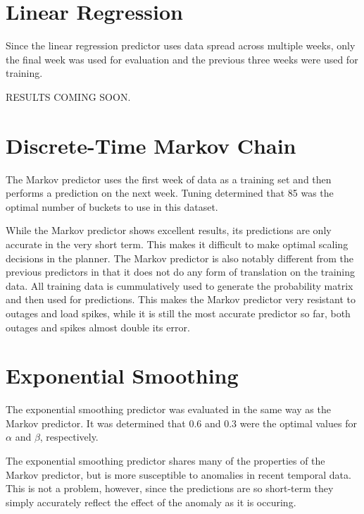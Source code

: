 

\section{Linear Regression}
Since the linear regression predictor uses data spread across multiple weeks, only the final week was used for evaluation and the previous three weeks were used for training.

RESULTS COMING SOON.



\section{Discrete-Time Markov Chain}
The Markov predictor uses the first week of data as a training set and then performs a prediction on the next week. Tuning determined that 85 was the optimal number of buckets to use in this dataset.

While the Markov predictor shows excellent results, its predictions are only accurate in the very short term. This makes it difficult to make optimal scaling decisions in the planner. The Markov predictor is also notably different from the previous predictors in that it does not do any form of translation on the training data. All training data is cummulatively used to generate the probability matrix and then used for predictions. This makes the Markov predictor very resistant to outages and load spikes, while it is still the most accurate predictor so far, both outages and spikes almost double its error.



\section{Exponential Smoothing}
The exponential smoothing predictor was evaluated in the same way as the Markov predictor. It was determined that 0.6 and 0.3 were the optimal values for $\alpha$ and $\beta$, respectively.

The exponential smoothing predictor shares many of the properties of the Markov predictor, but is more susceptible to anomalies in recent temporal data. This is not a problem, however, since the predictions are so short-term they simply accurately reflect the effect of the anomaly as it is occuring.

